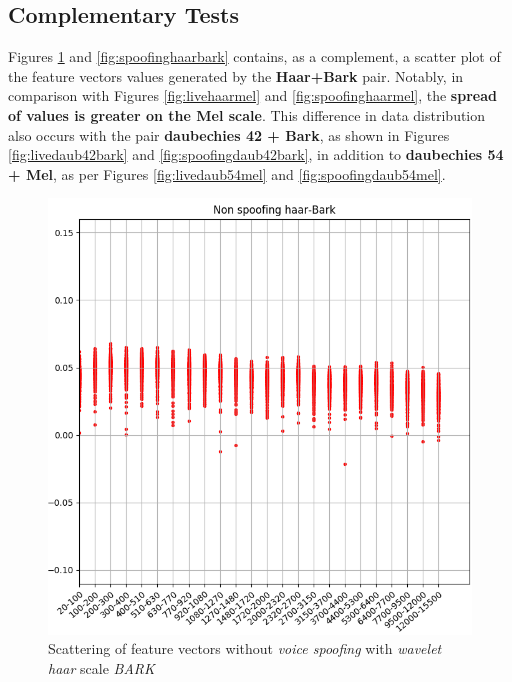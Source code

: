 \subsection{Complementary Tests}
\par Figures \ref{fig:livehaarbark} and \ref{fig:spoofinghaarbark} contains, as a complement, a scatter plot of the feature vectors values generated by the \textbf{Haar+Bark} pair. Notably, in comparison with Figures \ref{fig:livehaarmel} and \ref{fig:spoofinghaarmel}, the \textbf{spread of values is greater on the Mel scale}. This difference in data distribution also occurs with the pair \textbf{daubechies 42 + Bark}, as shown in Figures \ref{fig:livedaub42bark} and \ref{fig:spoofingdaub42bark}, in addition to \textbf{daubechies 54 + Mel}, as per Figures \ref{fig:livedaub54mel} and \ref{fig:spoofingdaub54mel}. 
\begin{figure}
\centering
\includegraphics[scale=.55]{images/results/barkVersusMel/liveHaarBark}
\caption{Scattering of feature vectors without \textit{voice spoofing} with \textit{wavelet haar} scale \textit {BARK}}
\label{fig:livehaarbark}
\end{figure}
